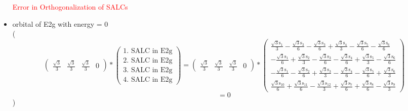 \documentclass[12pt,a4paper]{article}
\begin{document}
\begin{itemize}
\textcolor{red}{Error in Orthogonalization of SALCs}\item orbital of E2g with energy = 
                                $0$ \\
( 
$$
\begin{pmatrix}\frac{\sqrt{3}}{3} & \frac{\sqrt{3}}{3} & \frac{\sqrt{3}}{3} & 0\end{pmatrix} * \left(\begin{array}{c}\text{1. SALC in E2g} \\ \text{2. SALC in E2g} \\ \text{3. SALC in E2g} \\ \text{4. SALC in E2g}\end{array}\right) = \begin{pmatrix}\frac{\sqrt{3}}{3} & \frac{\sqrt{3}}{3} & \frac{\sqrt{3}}{3} & 0\end{pmatrix} * \begin{pmatrix}\frac{\sqrt{3} \text{s}_{1}}{3} - \frac{\sqrt{3} \text{s}_{2}}{6} - \frac{\sqrt{3} \text{s}_{3}}{6} + \frac{\sqrt{3} \text{s}_{4}}{3} - \frac{\sqrt{3} \text{s}_{5}}{6} - \frac{\sqrt{3} \text{s}_{6}}{6}\\- \frac{\sqrt{3} \text{s}_{1}}{6} + \frac{\sqrt{3} \text{s}_{2}}{3} - \frac{\sqrt{3} \text{s}_{3}}{6} - \frac{\sqrt{3} \text{s}_{4}}{6} + \frac{\sqrt{3} \text{s}_{5}}{3} - \frac{\sqrt{3} \text{s}_{6}}{6}\\- \frac{\sqrt{3} \text{s}_{1}}{6} - \frac{\sqrt{3} \text{s}_{2}}{6} + \frac{\sqrt{3} \text{s}_{3}}{3} - \frac{\sqrt{3} \text{s}_{4}}{6} - \frac{\sqrt{3} \text{s}_{5}}{6} + \frac{\sqrt{3} \text{s}_{6}}{3}\\\frac{\sqrt{3} \text{s}_{10}}{6} + \frac{\sqrt{3} \text{s}_{11}}{6} - \frac{\sqrt{3} \text{s}_{12}}{3} + \frac{\sqrt{3} \text{s}_{7}}{6} + \frac{\sqrt{3} \text{s}_{8}}{6} - \frac{\sqrt{3} \text{s}_{9}}{3}\end{pmatrix} 
 $$ $$ = 0 
 $$ 
 )


\end{itemize}
\end{document}
